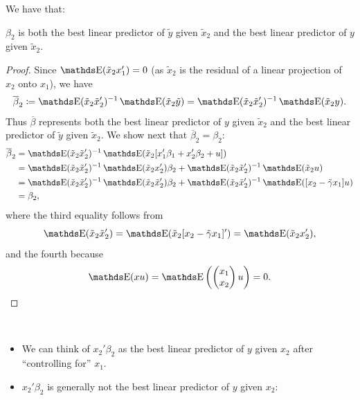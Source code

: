 \documentclass[letterpaper, 10pt]{article}
\begin{document}
We have that:
\begin{theorem}
  \(\beta_2\) is both the best linear predictor of \(\tilde{y}\) given \(\tilde{x}_2\) and the best linear predictor of \(y\) given \(\tilde{x}_2\).
\end{theorem}
\begin{proof}
  Since \(\E(\tilde{x}_2 x_1') = 0\) (as \(\tilde{x}_2\) is the residual of a linear projection of \(x_2\) onto \(x_1\)), we have
  \begin{align*}
    \overline{\beta}_2
    \coloneqq \E(\tilde{x}_2 \tilde{x}_2')^{-1} \E(\tilde{x}_2 \tilde{y})
    = \E(\tilde{x}_2 \tilde{x}_2')^{-1} \E(\tilde{x}_2 y).
  \end{align*}
  Thus \(\overline{\beta}\) represents both the best linear predictor of \(y\) given \(\tilde{x}_2\) and the best linear predictor of \(\tilde{y}\) given \(\tilde{x}_2\).
  We show next that \(\overline{\beta}_2 = \beta_2\):
  \begin{align*}
    \overline{\beta}_2
    &= \E(\tilde{x}_2 \tilde{x}_2')^{-1} \E(\tilde{x}_2 [x_1' \beta_1 + x_2' \beta_2 + u]) \\
    &= \E(\tilde{x}_2 \tilde{x}_2')^{-1} \E(\tilde{x}_2 x_2') \beta_2 + \E(\tilde{x}_2 \tilde{x}_2')^{-1} \E(\tilde{x}_2 u) \\
    &= \E(\tilde{x}_2 \tilde{x}_2')^{-1} \E(\tilde{x}_2 \tilde{x}_2') \beta_2 + \E(\tilde{x}_2 \tilde{x}_2')^{-1} \E([x_2 - \tilde{\gamma} x_1] u) \\
    &= \beta_2,
  \end{align*}
  where the third equality follows from
  \[
    \E(\tilde{x}_2 \tilde{x}_2')
    = \E(\tilde{x}_2 [x_2 - \tilde{\gamma} x_1]')
    = \E(\tilde{x}_2 x_2'),
  \]
  and the fourth because
  \[
    \E(xu) = \E\left( \pmat{x_1 \\ x_2} u \right) = 0.
  \]
\end{proof}
\begin{remark}~
  \begin{itemize}
    \item We can think of \(x_2' \beta_2\) as the best linear predictor of \(y\) given \(x_2\) after ``controlling for'' \(x_1\).
    \item \(x_2' \beta_2\) is generally not the best linear predictor of \(y\) given \(x_2\):
  \end{itemize}
\end{remark}
\end{document}
